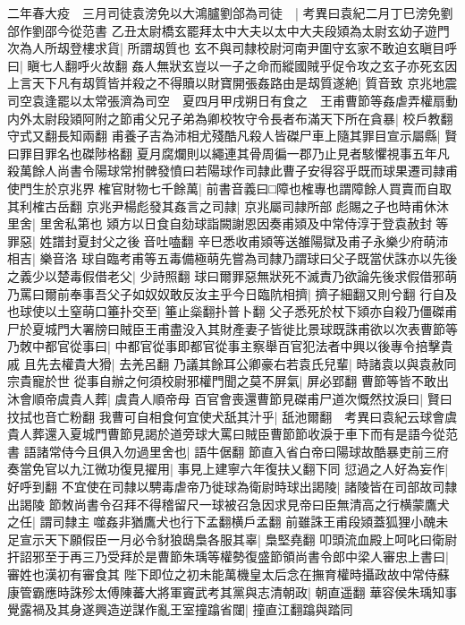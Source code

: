 二年春大疫　三月司徒袁滂免以大鴻臚劉郃為司徒　|{
	考異曰袁紀二月丁巳滂免劉郃作劉邵今從范書}
乙丑太尉橋玄罷拜太中大夫以太中大夫段熲為太尉玄幼子遊門次為人所刼登樓求貨|{
	所謂刼質也}
玄不與司隸校尉河南尹圍守玄家不敢迫玄瞋目呼曰|{
	瞋七人翻呼火故翻}
姦人無狀玄豈以一子之命而縱國賊乎促令攻之玄子亦死玄因上言天下凡有刼質皆并殺之不得贖以財寶開張姦路由是刼質遂絶|{
	質音致}
京兆地震　司空袁逢罷以太常張濟為司空　夏四月甲戌朔日有食之　王甫曹節等姦虐弄權扇動内外太尉段熲阿附之節甫父兄子弟為卿校牧守令長者布滿天下所在貪暴|{
	校戶教翻守式又翻長知兩翻}
甫養子吉為沛相尤殘酷凡殺人皆磔尸車上隨其罪目宣示屬縣|{
	賢曰罪目罪名也磔陟格翻}
夏月腐爛則以繩連其骨周徧一郡乃止見者駭懼視事五年凡殺萬餘人尚書令陽球常拊髀發憤曰若陽球作司隷此曹子安得容乎既而球果遷司隷甫使門生於京兆界榷官財物七千餘萬|{
	前書音義曰□障也榷專也謂障餘人買賣而自取其利榷古岳翻}
京兆尹楊彪發其姦言之司隷|{
	京兆屬司隷所部}
彪賜之子也時甫休沐里舍|{
	里舍私第也}
熲方以日食自劾球詣闕謝恩因奏甫熲及中常侍淳于登袁赦封等罪惡|{
	姓譜封夏封父之後音吐嗑翻}
辛巳悉收甫熲等送雒陽獄及甫子永樂少府萌沛相吉|{
	樂音洛}
球自臨考甫等五毒備極萌先嘗為司隸乃謂球曰父子既當伏誅亦以先後之義少以楚毒假借老父|{
	少詩照翻}
球曰爾罪惡無狀死不滅責乃欲論先後求假借邪萌乃罵曰爾前奉事吾父子如奴奴敢反汝主乎今日臨阬相擠|{
	擠子細翻又則兮翻}
行自及也球使以土窒萌口箠扑交至|{
	箠止橤翻扑普卜翻}
父子悉死於杖下熲亦自殺乃僵磔甫尸於夏城門大署牓曰賊臣王甫盡没入其財產妻子皆徙比景球既誅甫欲以次表曹節等乃敇中都官從事曰|{
	中都官從事即都官從事主察舉百官犯法者中興以後專令掊擊貴戚}
且先去權貴大猾|{
	去羌呂翻}
乃議其餘耳公卿豪右若袁氏兒輩|{
	時諸袁以與袁赦同宗貴寵於世}
從事自辦之何須校尉邪權門聞之莫不屏氣|{
	屏必郢翻}
曹節等皆不敢出沐會順帝虞貴人葬|{
	虞貴人順帝母}
百官會喪還曹節見磔甫尸道次慨然抆淚曰|{
	賢曰抆拭也音亡粉翻}
我曹可自相食何宜使犬舐其汁乎|{
	舐池爾翻　考異曰袁紀云球會虞貴人葬還入夏城門曹節見謁於道旁球大罵曰賊臣曹節節收淚于車下而有是語今從范書}
語諸常侍今且俱入勿過里舍也|{
	語牛倨翻}
節直入省白帝曰陽球故酷暴吏前三府奏當免官以九江微功復見擢用|{
	事見上建寧六年復扶乂翻下同}
愆過之人好為妄作|{
	好呼到翻}
不宜使在司隸以騁毒虐帝乃徙球為衛尉時球出謁陵|{
	諸陵皆在司部故司隸出謁陵}
節敇尚書令召拜不得稽留尺一球被召急因求見帝曰臣無清高之行横蒙鷹犬之任|{
	謂司隸主噬姦非猶鷹犬也行下孟翻横戶孟翻}
前雖誅王甫段熲蓋狐狸小醜未足宣示天下願假臣一月必令豺狼鴟梟各服其辜|{
	梟堅堯翻}
叩頭流血殿上呵叱曰衛尉扞詔邪至于再三乃受拜於是曹節朱瑀等權勢復盛節領尚書令郎中梁人審忠上書曰|{
	審姓也漢初有審食其}
陛下即位之初未能萬機皇太后念在撫育權時攝政故中常侍蘇康管霸應時誅殄太傅陳蕃大將軍竇武考其黨與志清朝政|{
	朝直遥翻}
華容侯朱瑀知事覺露禍及其身遂興造逆謀作亂王室撞蹹省闥|{
	撞直江翻蹹與踏同}

